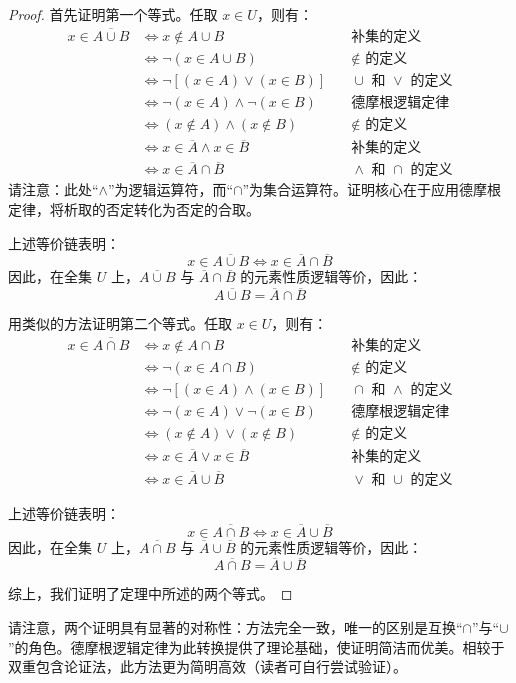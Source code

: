 \begin{proof}
    首先证明第一个等式。任取 $x \in U$，则有：
    \begin{align*}
        x \in \overline{A \cup B} &\iff x \notin A \cup B &\quad \text{补集的定义}\\
        &\iff \neg(x \in A \cup B) &\quad \notin \text{\ 的定义}\\
        &\iff \neg[(x \in A) \lor (x \in B)] &\quad \cup \text{\ 和\ } \lor \text{\ 的定义}\\
        &\iff \neg(x \in A) \land \neg(x \in B) &\quad \text{德摩根逻辑定律}\\
        &\iff (x \notin A) \land (x \notin B) &\quad \notin \text{\ 的定义}\\
        &\iff x \in \overline{A} \land x \in \overline{B} &\quad \text{补集的定义}\\
        &\iff x \in \overline{A} \cap \overline{B} &\quad \land \text{\ 和\ } \cap \text{\ 的定义}
    \end{align*}
    请注意：此处``$\land$''为逻辑运算符，而``$\cap$''为集合运算符。证明核心在于应用德摩根定律，将析取的否定转化为否定的合取。

    上述等价链表明：
    \[x \in \overline{A \cup B} \iff x \in \overline{A} \cap \overline{B}\]
    因此，在全集 $U$ 上，$\overline{A \cup B}$ 与 $\overline{A} \cap \overline{B}$ 的元素性质逻辑等价，因此：
    \[\overline{A \cup B} = \overline{A} \cap \overline{B}\]

    用类似的方法证明第二个等式。任取 $x \in U$，则有：
    \begin{align*}
        x \in \overline{A \cap B} &\iff x \notin A \cap B &\quad \text{补集的定义}\\
        &\iff \neg(x \in A \cap B) &\quad \notin \text{\ 的定义}\\
        &\iff \neg[(x \in A) \land (x \in B)] &\quad \cap \text{\ 和\ } \land \text {\ 的定义}\\
        &\iff \neg(x \in A) \lor \neg(x \in B) &\quad \text{德摩根逻辑定律}\\
        &\iff (x \notin A) \lor (x \notin B) &\quad \notin \text{\ 的定义}\\
        &\iff x \in \overline{A} \lor x \in \overline{B} &\quad \text{补集的定义}\\
        &\iff x \in \overline{A} \cup \overline{B} &\quad \lor \text{\ 和\ } \cup \text{\ 的定义}
    \end{align*}

    上述等价链表明：
    \[x \in \overline{A \cap B} \iff x \in \overline{A} \cup \overline{B}\]
    因此，在全集 $U$ 上，$\overline{A \cap B}$ 与 $\overline{A} \cup \overline{B}$ 的元素性质逻辑等价，因此：
    \[\overline{A \cap B} = \overline{A} \cup \overline{B}\]

    综上，我们证明了定理中所述的两个等式。
\end{proof}


请注意，两个证明具有显著的对称性：方法完全一致，唯一的区别是互换``$\cap$''与``$\cup$''的角色。德摩根逻辑定律为此转换提供了理论基础，使证明简洁而优美。相较于双重包含论证法，此方法更为简明高效（读者可自行尝试验证）。

\clearpage
